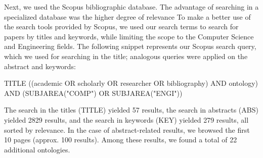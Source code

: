 
Next, we used the Scopus bibliographic database.
The advantage of searching in a specialized database was the higher degree of relevance 
To make a better use of the search tools provided by Scopus, we used our search terms to search for papers by titles and keywords, while limiting the scope to the Computer Science and Engineering fields. The following snippet represents our Scopus search query, which we used for searching in the title; analogous queries were applied on the abstract and keywords:

\begin{lcverbatim}
TITLE ((academic OR scholarly OR researcher OR bibliography) 
    AND  ontology) AND (SUBJAREA("COMP") OR  SUBJAREA("ENGI")) 
\end{lcverbatim}

The search in the titles (TITLE) yielded 57 results, the search in abstracts (ABS) yielded 2829 results, and the search in keywords (KEY) yielded 279 results, all sorted by relevance. In the case of abstract-related results, we browsed the first 10 pages (approx. 100 results). Among these results, we found a total of 22 additional ontologies.


